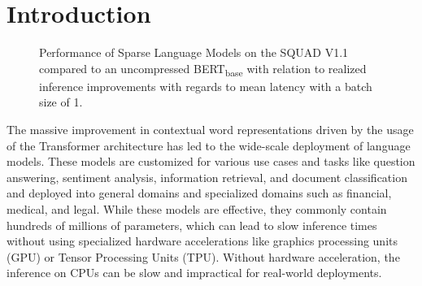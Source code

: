 \documentclass[11pt]{article}
\begin{document}
\section{Introduction}
\begin{figure}[!htb]
    \centering
    \caption{Performance of Sparse Language Models on the SQUAD V1.1 \cite{Rajpurkar2016SQuAD10} compared to an uncompressed BERT\textsubscript{base} \cite{Devlin2019BERTPO} with relation to realized inference improvements with regards to mean latency with a batch size of 1.}
    \label{fig:squadv1}
\end{figure}
The massive improvement in contextual word representations driven by the usage of the Transformer architecture \cite{Vaswani2017AttentionIA} has led to the wide-scale deployment of language models. These models are customized for various use cases and tasks like question answering, sentiment analysis, information retrieval, and document classification and deployed into general domains and specialized domains such as financial, medical, and legal. While these models are effective, they commonly contain hundreds of millions of parameters, which can lead to slow inference times without using specialized hardware accelerations like graphics processing units (GPU) or Tensor Processing Units (TPU). Without hardware acceleration, the inference on CPUs can be slow and impractical for real-world deployments.\\
\end{document}

